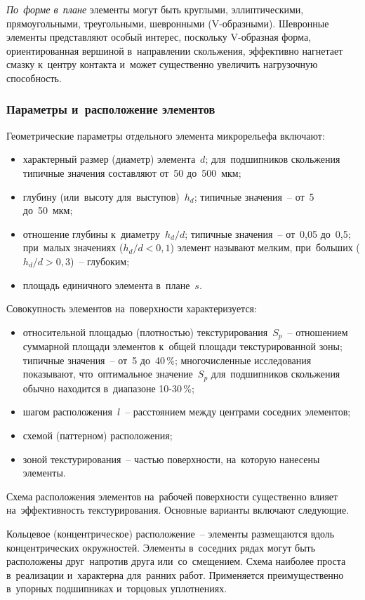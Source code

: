 \textit{По~форме в~плане} элементы могут быть круглыми, эллиптическими, прямоугольными, треугольными, шевронными (V-образными). Шевронные элементы представляют особый интерес, поскольку V-образная форма, ориентированная вершиной в~направлении скольжения, эффективно нагнетает смазку к~центру контакта и~может существенно увеличить нагрузочную способность.

\subsubsection{Параметры и~расположение элементов}

Геометрические параметры отдельного элемента микрорельефа включают:
\begin{itemize}
\item характерный размер (диаметр) элемента~$d$; для~подшипников скольжения типичные значения составляют от~50 до~500~мкм;
\item глубину (или~высоту для~выступов)~$h_d$; типичные значения~-- от~5 до~50~мкм;
\item отношение глубины к~диаметру~$h_d/d$; типичные значения~-- от~0{,}05 до~0{,}5; при~малых значениях ($h_d/d < 0{,}1$) элемент называют мелким, при~больших ($h_d/d > 0{,}3$)~-- глубоким;
\item площадь единичного элемента в~плане~$s$.
\end{itemize}

Совокупность элементов на~поверхности характеризуется:
\begin{itemize}
\item относительной площадью (плотностью) текстурирования~$S_p$~-- отношением суммарной площади элементов к~общей площади текстурированной зоны; типичные значения~-- от~5 до~40\,\%; многочисленные исследования показывают, что~оптимальное значение~$S_p$ для~подшипников скольжения обычно находится в~диапазоне 10-30\,\%;
\item шагом расположения~$l$~-- расстоянием между центрами соседних элементов;
\item схемой (паттерном) расположения;
\item зоной текстурирования~-- частью поверхности, на~которую нанесены элементы.
\end{itemize}

Схема расположения элементов на~рабочей поверхности существенно влияет на~эффективность текстурирования. Основные варианты включают следующие.

Кольцевое (концентрическое) расположение~-- элементы размещаются вдоль концентрических окружностей. Элементы в~соседних рядах могут быть расположены друг~напротив друга или~со~смещением. Схема наиболее проста в~реализации и~характерна для~ранних работ. Применяется преимущественно в~упорных подшипниках и~торцовых уплотнениях.

